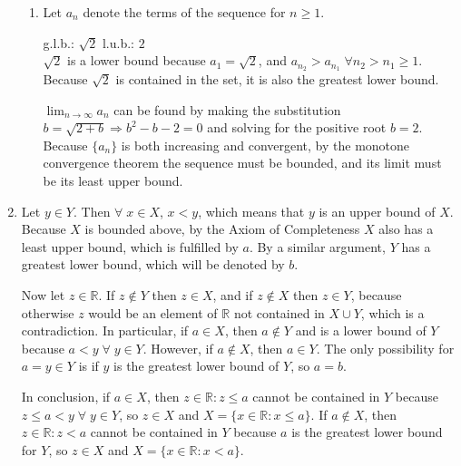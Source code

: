 \documentclass[a4paper,12pt]{article}
\begin{document}
\begin{enumerate}
\begin{enumerate}
                    \item
                        Let $a_n$ denote the terms of the sequence for $n \geq 1$. \par
                        g.l.b.: $\sqrt{2}$ \space \space l.u.b.: $2$ \\
                        $\sqrt{2}$ is a lower bound because $a_1 = \sqrt{2}$, and $a_{n_2} > a_{n_1} \; \forall n_2 > n_1 \geq 1$. Because $\sqrt{2}$ is contained in the set, it is also the greatest lower bound. \par
                        $\lim_{n \to \infty} a_n$ can be found by making the substitution $b = \sqrt{2 + b} \Rightarrow b^2 - b - 2 = 0$ and solving for the positive root $b = 2$. Because $\{ a_n \}$ is both increasing and convergent, by the monotone convergence theorem the sequence must be bounded, and its limit must be its least upper bound.
                \end{enumerate}

            \setcounter{enumi}{11}
            \item
                Let $y \in Y$. Then $\forall \; x \in X$, $x < y$, which means that $y$ is an upper bound of $X$. Because $X$ is bounded above, by the Axiom of Completeness $X$ also has a least upper bound, which is fulfilled by $a$. By a similar argument, $Y$ has a greatest lower bound, which will be denoted by $b$. \par
                Now let $z \in \mathbb{R}$. If $z \notin Y$ then $z \in X$, and if $z \notin X$ then $z \in Y$, because otherwise $z$ would be an element of $\mathbb{R}$ not contained in $X \cup Y$, which is a contradiction. In particular, if $a \in X$, then $a \notin Y$ and is a lower bound of $Y$ because $a < y \; \forall \; y \in Y$. However, if $a \notin X$, then $a \in Y$. The only possibility for $a = y \in Y$ is if $y$ is the greatest lower bound of $Y$, so $a = b$. \par
                In conclusion, if $a \in X$, then $z \in \mathbb{R} : z \leq a$ cannot be contained in $Y$ because $z \leq a < y \; \forall \; y \in Y$, so $z \in X$ and $X = \{ x \in \mathbb{R} : x \leq a \}$. If $a \notin X$, then $z \in \mathbb{R} : z < a$ cannot be contained in $Y$ because $a$ is the greatest lower bound for $Y$, so $z \in X$ and $X = \{ x \in \mathbb{R} : x < a \}$.

        \end{enumerate}
\end{document}
